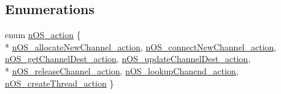 \subsection*{Enumerations}
\begin{DoxyCompactItemize}
\item 
enum \hyperlink{_swallow-n_o_s__asm_8h_a2c85818d9b314baf7682c74f9e2cacb9}{n\+O\+S\+\_\+action} \{ \\*
\hyperlink{_swallow-n_o_s__asm_8h_a2c85818d9b314baf7682c74f9e2cacb9a6a6ad474dd9309d89a5f755ef380c046}{n\+O\+S\+\_\+allocate\+New\+Channel\+\_\+action}, 
\hyperlink{_swallow-n_o_s__asm_8h_a2c85818d9b314baf7682c74f9e2cacb9a3e259d46d21845ab6e64df4a6c9e77f9}{n\+O\+S\+\_\+connect\+New\+Channel\+\_\+action}, 
\hyperlink{_swallow-n_o_s__asm_8h_a2c85818d9b314baf7682c74f9e2cacb9a32fb1a0febb14e67901c499dd4a7ccec}{n\+O\+S\+\_\+get\+Channel\+Dest\+\_\+action}, 
\hyperlink{_swallow-n_o_s__asm_8h_a2c85818d9b314baf7682c74f9e2cacb9af0981ba86317df5f7a4ddd9f061aad0c}{n\+O\+S\+\_\+update\+Channel\+Dest\+\_\+action}, 
\\*
\hyperlink{_swallow-n_o_s__asm_8h_a2c85818d9b314baf7682c74f9e2cacb9ae27b6f6ada7e08733595d37a8d065e2b}{n\+O\+S\+\_\+release\+Channel\+\_\+action}, 
\hyperlink{_swallow-n_o_s__asm_8h_a2c85818d9b314baf7682c74f9e2cacb9a8b8ccb0afbf0d23e42ba177ac4959ef9}{n\+O\+S\+\_\+lookup\+Chanend\+\_\+action}, 
\hyperlink{_swallow-n_o_s__asm_8h_a2c85818d9b314baf7682c74f9e2cacb9af32f4947dc1710266dc6a3944a6de469}{n\+O\+S\+\_\+create\+Thread\+\_\+action}
 \}
\end{DoxyCompactItemize}
